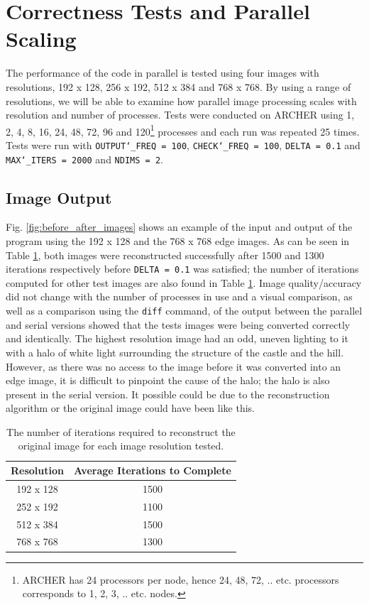 \documentclass[11pt, a4paper]{article}
\begin{document}
	\section{Correctness Tests and Parallel Scaling}
		The performance of the code in parallel is tested using four images with resolutions, 192 x 128, 256 x 192, 512 x 384 and 768 x 768. By using a range of resolutions, we will be able to examine how parallel image processing scales with resolution and number of processes. Tests were conducted on ARCHER using 1, 2, 4, 8, 16, 24, 48, 72, 96 and 120\footnote{ARCHER has 24 processors per node, hence 24, 48, 72, .. etc. processors corresponds to 1, 2, 3, .. etc. nodes.} processes and each run was repeated 25 times. Tests were run with \texttt{OUTPUT\char`_FREQ = 100}, \texttt{CHECK\char`_FREQ = 100}, \texttt{DELTA = 0.1} and \texttt{MAX\char`_ITERS = 2000} and \texttt{NDIMS = 2}.

		\subsection{Image Output}				
			Fig. \ref{fig:before_after_images} shows an example of the input and output of the program using the 192 x 128 and the 768 x 768 edge images. As can be seen in Table \ref{tab:iterations}, both images were reconstructed successfully after 1500 and 1300 iterations respectively before \texttt{DELTA = 0.1} was satisfied; the number of iterations computed for other test images are also found in Table \ref{tab:iterations}. Image quality/accuracy did not change with the number of processes in use and a visual comparison, as well as a comparison using the \texttt{diff} command, of the output between the parallel and serial versions showed that the tests images were being converted correctly and identically. The highest resolution image had an odd, uneven lighting to it with a halo of white light surrounding the structure of the castle and the hill. However, as there was no access to the image before it was converted into an edge image, it is difficult to pinpoint the cause of the halo; the halo is also present in the serial version. It possible could be due to the reconstruction algorithm or the original image could have been like this.
				
			\begin{table}[]
				\centering
				\begin{tabular}{|c|c|}
					\hline
					\textbf{Resolution} & \textbf{Average Iterations to Complete} \\ \hline
					192 x 128           & 1500                                    \\
					252 x 192           & 1100                                    \\
					512 x 384           & 1500                                    \\
					768 x 768           & 1300                                    \\ \hline
				\end{tabular}
				\caption{The number of iterations required to reconstruct the original image for each image resolution tested.}
				\label{tab:iterations}
			\end{table}	
				
\end{document}
